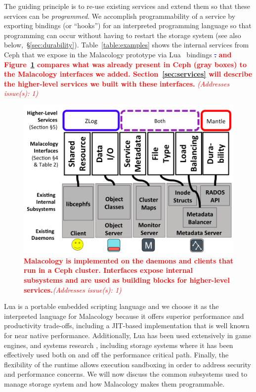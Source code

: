 \documentclass[preprint]{sigplanconf-eurosys}
\newcommand{\newcomment}[1]{{\textcolor{red}{\textbf{#1}}}}
\newcommand{\oldcomment}[1]{{\textcolor{blue}{\textbf{\sout{#1}}}}}
\newcommand{\addressesissue}[1]{{\textcolor{red}{{\it (Addresses issue(s): {#1})}}}}
\begin{document}
The guiding principle is to re-use existing services and extend them so that
these services can be \emph{programmed}. We accomplish programmability of a
service by exporting bindings (or ``hooks'') for an interpreted programming
language so that programming can occur without having to restart the storage
system (see also below,~\S\ref{sec:durability}). Table~\ref{table:examples}
shows the internal services from Ceph that we expose in the Malacology
prototype via Lua~\cite{ierusalimschy1996lua} bindings
\oldcomment{.}
\newcomment{and Figure~\ref{fig:implementation-overview} compares what was
already present in Ceph (gray boxes) to the Malacology interfaces we added.
Section~\ref{sec:services} will describe the higher-level services we built
with these interfaces.}
\addressesissue{1}

\begin{figure}[tbp]
\centering
\includegraphics{figures/implementation-overview.png}
\caption{\newcomment{Malacology is implemented on the daemons and clients that
run in a Ceph cluster. Interfaces expose internal subsystems and are used as
building blocks for higher-level services.}\addressesissue{1}
\label{fig:implementation-overview}}
\end{figure}

Lua is a portable embedded scripting language and we choose it as the
interpreted language for Malacology because it offers superior performance and
productivity trade-offs, including a JIT-based implementation that is well
known for near native performance. Additionally, Lua has been used extensively
in game engines, and systems research \cite{neto:dls14-luaos}, including
storage systems where it has been effectively used both on
\cite{grawinkel:pdsw2012-lua,watkins2013:bdmc13-in-vivo,geambasu_comet_2010}
and off \cite{sevilla:sc15-mantle} the performance critical path. Finally, the
flexibility of the runtime allows execution sandboxing in order to address
security and performance concerns. We will now discuss the common subsystems
used to manage storage system and how Malacology makes them programmable.
\end{document}
